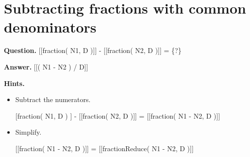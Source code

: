 \documentclass{article}
\begin{document}
\section*{Subtracting fractions with common denominators}
\textbf{Question.} [[fraction( N1, D )]] - [[fraction( N2, D )]] = \{?\}

\textbf{Answer.} [[( N1 - N2 ) / D]]

\textbf{Hints.}
\begin{itemize}
  \item Subtract the numerators.
  \item [[fraction( N1, D )]] - [[fraction( N2, D )]] = [[fraction( N1 - N2, D )]]
  \item Simplify.
            
            [[fraction( N1 - N2, D )]] = [[fractionReduce( N1 - N2, D )]]
\end{itemize}
\end{document}
